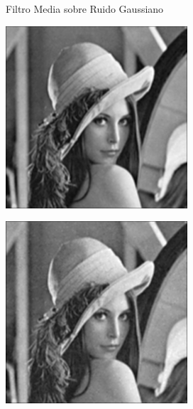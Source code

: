 \documentclass{beamer}
\begin{document}
\begin{frame}[fragile]{Filtro Media sobre Ruido Gaussiano}
	\begin{minipage}{0.25\linewidth}
		\centering
		\includegraphics[width=\linewidth]{../results/lena_gauss_sigma10_media}
	\end{minipage}\hfill
	\begin{minipage}{0.25\linewidth}
		\centering
		\includegraphics[width=\linewidth]{../results/lena_gauss_sigma20_media}

\end{minipage}
\end{frame}
\end{document}

